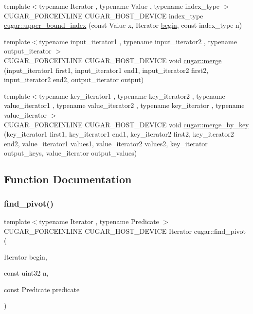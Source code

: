 \begin{DoxyCompactItemize}
\item 
{\footnotesize template$<$typename Iterator , typename Value , typename index\+\_\+type $>$ }\\C\+U\+G\+A\+R\+\_\+\+F\+O\+R\+C\+E\+I\+N\+L\+I\+NE C\+U\+G\+A\+R\+\_\+\+H\+O\+S\+T\+\_\+\+D\+E\+V\+I\+CE index\+\_\+type \hyperlink{group___algorithms_module_ga8f544d88f3f11cd945933bfa50626375}{cugar\+::upper\+\_\+bound\+\_\+index} (const Value x, Iterator \hyperlink{namespacecugar_a2121df08f967e232ea5fe0ee378dee67}{begin}, const index\+\_\+type n)
\item 
{\footnotesize template$<$typename input\+\_\+iterator1 , typename input\+\_\+iterator2 , typename output\+\_\+iterator $>$ }\\C\+U\+G\+A\+R\+\_\+\+F\+O\+R\+C\+E\+I\+N\+L\+I\+NE C\+U\+G\+A\+R\+\_\+\+H\+O\+S\+T\+\_\+\+D\+E\+V\+I\+CE void \hyperlink{group___algorithms_module_gae6ef81c9ca1cd3976caad12299e37452}{cugar\+::merge} (input\+\_\+iterator1 first1, input\+\_\+iterator1 end1, input\+\_\+iterator2 first2, input\+\_\+iterator2 end2, output\+\_\+iterator output)
\item 
{\footnotesize template$<$typename key\+\_\+iterator1 , typename key\+\_\+iterator2 , typename value\+\_\+iterator1 , typename value\+\_\+iterator2 , typename key\+\_\+iterator , typename value\+\_\+iterator $>$ }\\C\+U\+G\+A\+R\+\_\+\+F\+O\+R\+C\+E\+I\+N\+L\+I\+NE C\+U\+G\+A\+R\+\_\+\+H\+O\+S\+T\+\_\+\+D\+E\+V\+I\+CE void \hyperlink{group___algorithms_module_ga267a2752f3e81f521e759ec274b80561}{cugar\+::merge\+\_\+by\+\_\+key} (key\+\_\+iterator1 first1, key\+\_\+iterator1 end1, key\+\_\+iterator2 first2, key\+\_\+iterator2 end2, value\+\_\+iterator1 values1, value\+\_\+iterator2 values2, key\+\_\+iterator output\+\_\+keys, value\+\_\+iterator output\+\_\+values)
\end{DoxyCompactItemize}


\subsection{Function Documentation}
\mbox{\label{group___algorithms_module_gaf5c0f35d93fa8af4939155b21c7e2a4f}} 
\subsubsection{\texorpdfstring{find\+\_\+pivot()}{find\_pivot()}}
{\footnotesize\ttfamily template$<$typename Iterator , typename Predicate $>$ \\
C\+U\+G\+A\+R\+\_\+\+F\+O\+R\+C\+E\+I\+N\+L\+I\+NE C\+U\+G\+A\+R\+\_\+\+H\+O\+S\+T\+\_\+\+D\+E\+V\+I\+CE Iterator cugar\+::find\+\_\+pivot (\begin{DoxyParamCaption}\item[{Iterator}]{begin,  }\item[{const uint32}]{n,  }\item[{const Predicate}]{predicate }\end{DoxyParamCaption})}

